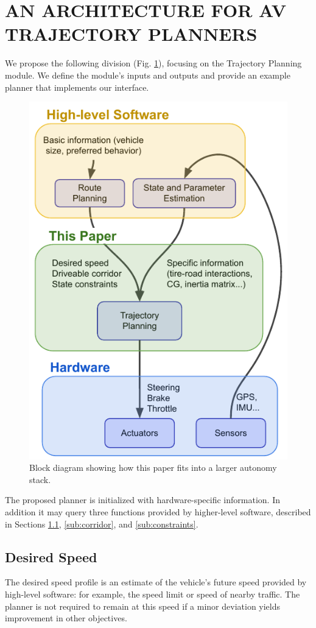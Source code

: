 \documentclass[letterpaper, 10 pt, conference]{ieeeconf}  %
\begin{document}
\section{AN ARCHITECTURE FOR AV TRAJECTORY PLANNERS}

We propose the following division (Fig. \ref{fig:block}), focusing on the Trajectory Planning module. We define the module's inputs and outputs and provide an example planner that implements our interface.

\begin{figure}[h]
	\centering
	\includegraphics[width=0.75\linewidth]{figures/block_diagram.pdf}
	\caption{Block diagram showing how this paper fits into a larger autonomy stack.}
	\label{fig:block}
\end{figure}

The proposed planner is initialized with hardware-specific information. In addition it may query three functions provided by higher-level software, described in Sections \ref{sub:speed}, \ref{sub:corridor}, and \ref{sub:constraints}.

\subsection{Desired Speed} \label{sub:speed}
The desired speed profile is an estimate of the vehicle's future speed provided by high-level software: for example, the speed limit or speed of nearby traffic. The planner is not required to remain at this speed if a minor deviation yields improvement in other objectives.
\end{document}
